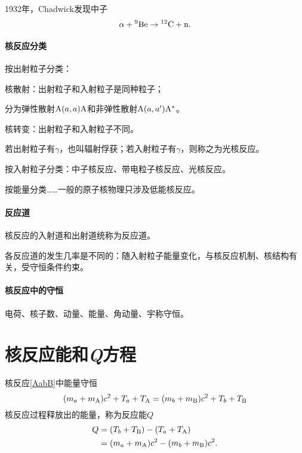 1932年，Chadwick发现中子
\[
	\alpha+{^{9}\mathrm{Be}}\to{^{12}\mathrm{C}}+\mathrm n.
\]
\paragraph{核反应分类}
按出射粒子分类：
\begin{compactitem}
	\item 核散射：出射粒子和入射粒子是同种粒子；
	
	分为弹性散射${\mathrm{A}}(a,a){\mathrm{A}}$和非弹性散射${\mathrm{A}}(a,a'){\mathrm{A}^\ast}$。
	\item 核转变：出射粒子和入射粒子不同。
	
	若出射粒子有$\gamma$，也叫辐射俘获；若入射粒子有$\gamma$，则称之为光核反应。
\end{compactitem}
按入射粒子分类：中子核反应、带电粒子核反应、光核反应。

按能量分类……一般的原子核物理只涉及低能核反应。
\paragraph{反应道}核反应的入射道和出射道统称为反应道。

各反应道的发生几率是不同的：随入射粒子能量变化，与核反应机制、核结构有关，受守恒条件约束。

\paragraph{核反应中的守恒}电荷、核子数、动量、能量、角动量、宇称守恒。
\section{核反应能和\textit{Q}方程}
核反应\eqref{AabB}中能量守恒
\[
	(m_a+m_{\mathrm{A}})c^2+T_a+T_{\mathrm{A}}=(m_b+m_{\mathrm{B}})c^2+T_b+T_{\mathrm{B}}
\]
核反应过程释放出的能量，称为反应能$Q$
\begin{align}\notag
	Q&=(T_b+T_{\mathrm{B}})-(T_a+T_{\mathrm{A}})\\
	&=(m_a+m_{\mathrm{A}})c^2-(m_b+m_{\mathrm{B}})c^2.
\end{align}
